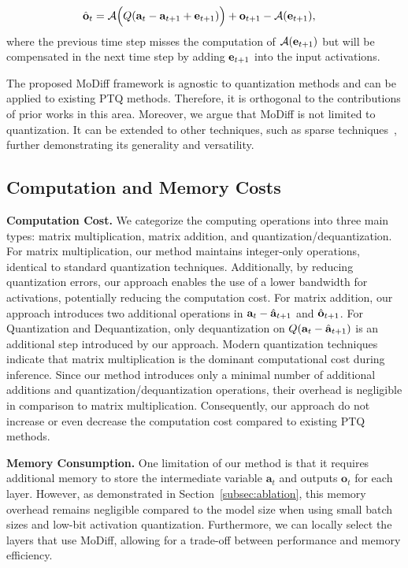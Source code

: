 \begin{align}
\hat{{\mathbf{o}}}_{t} &= {\mathcal{A}}\Big( Q({\mathbf{a}}_{t}-{\mathbf{a}}_{t+1} + {\mathbf{e}}_{t+1})
\Big) + {\mathbf{o}}_{t+1} - {\mathcal{A}}({\mathbf{e}}_{t+1}), \nonumber
\end{align}
where the previous time step misses the computation of ${\mathcal{A}}({\mathbf{e}}_{t+1})$ but will be compensated in the next time step by adding ${\mathbf{e}}_{t+1}$ into the input activations. 

\begin{remark}
The proposed MoDiff framework is agnostic to quantization methods and can be applied to existing PTQ methods. Therefore, it is orthogonal to the contributions of prior works in this area. Moreover, we argue that MoDiff is not limited to quantization. It can be extended to other techniques, such as sparse techniques~\citep{han2015deep}, further demonstrating its generality and versatility.
\end{remark}

\subsection{Computation and Memory Costs}
\label{subsec:cost}
\textbf{Computation Cost.} We categorize the computing operations into three main types: matrix multiplication, matrix addition, and quantization/dequantization. For matrix multiplication, our method maintains integer-only operations, identical to standard quantization techniques. Additionally, by reducing quantization errors, our approach enables the use of a lower bandwidth for activations, potentially reducing the computation cost. For matrix addition, our approach introduces two additional operations in ${\mathbf{a}}_t-\hat{{\mathbf{a}}}_{t+1}$ and $\hat{{\mathbf{o}}}_{t+1}$. For Quantization and Dequantization, only dequantization on \( Q({\mathbf{a}}_t - \hat{{\mathbf{a}}}_{t+1}) \) is an additional step introduced by our approach. Modern quantization techniques \citep{nagel2021white} indicate that matrix multiplication is the dominant computational cost during inference. Since our method introduces only a minimal number of additional additions and quantization/dequantization operations, their overhead is negligible in comparison to matrix multiplication. Consequently, our approach do not increase or even decrease the computation cost compared to existing PTQ methods.

\textbf{Memory Consumption.} One limitation of our method is that it requires additional memory to store the intermediate variable \(\mathbf{a}_t\) and outputs \(\mathbf{o}_t\) for each layer. However, as demonstrated in Section~\ref{subsec:ablation}, this memory overhead remains negligible compared to the model size when using small batch sizes and low-bit activation quantization. Furthermore, we can locally select the layers that use MoDiff, allowing for a trade-off between performance and memory efficiency.  

